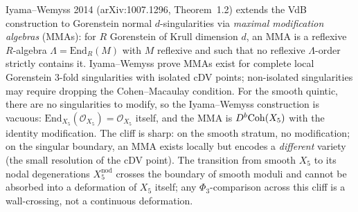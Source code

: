 \begin{remark}
\label{rem:cy-c-beyond-iw-cliff}
Iyama--Wemyss 2014 (arXiv:1007.1296, Theorem~1.2) extends the VdB
construction to Gorenstein normal $d$-singularities via
\emph{maximal modification algebras} (MMAs): for $R$ Gorenstein of
Krull dimension $d$, an MMA is a reflexive $R$-algebra
$\Lambda = \mathrm{End}_R(M)$ with $M$ reflexive and such that no
reflexive $\Lambda$-order strictly contains it. Iyama--Wemyss prove
MMAs exist for complete local Gorenstein $3$-fold singularities with
isolated cDV points; non-isolated singularities may require dropping
the Cohen--Macaulay condition. For the smooth quintic, there are no
singularities to modify, so the Iyama--Wemyss construction is vacuous:
$\mathrm{End}_{X_5}(\mathcal O_{X_5}) = \mathcal O_{X_5}$ itself, and
the MMA is $D^b\mathrm{Coh}(X_5)$ with the identity modification. The cliff
is sharp: on the smooth stratum, no modification; on the singular
boundary, an MMA exists locally but encodes a \emph{different}
variety (the small resolution of the cDV point). The transition from
smooth $X_5$ to its nodal degenerations $X_5^{\mathrm{nod}}$ crosses
the boundary of smooth moduli and cannot be absorbed into a deformation
of $X_5$ itself; any $\Phi_3$-comparison across this cliff is a
wall-crossing, not a continuous deformation.
\end{remark}

